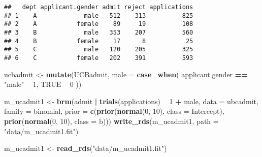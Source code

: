 \documentclass[]{article}
\newenvironment{Shaded}{\begin{snugshade}}{\end{snugshade}}
\newcommand{\KeywordTok}[1]{\textcolor[rgb]{0.13,0.29,0.53}{\textbf{#1}}}
\newcommand{\DataTypeTok}[1]{\textcolor[rgb]{0.13,0.29,0.53}{#1}}
\newcommand{\DecValTok}[1]{\textcolor[rgb]{0.00,0.00,0.81}{#1}}
\newcommand{\StringTok}[1]{\textcolor[rgb]{0.31,0.60,0.02}{#1}}
\newcommand{\OtherTok}[1]{\textcolor[rgb]{0.56,0.35,0.01}{#1}}
\newcommand{\OperatorTok}[1]{\textcolor[rgb]{0.81,0.36,0.00}{\textbf{#1}}}
\newcommand{\NormalTok}[1]{#1}
\begin{document}
\begin{verbatim}
##   dept applicant.gender admit reject applications
## 1    A             male   512    313          825
## 2    A           female    89     19          108
## 3    B             male   353    207          560
## 4    B           female    17      8           25
## 5    C             male   120    205          325
## 6    C           female   202    391          593
\end{verbatim}

\begin{Shaded}
\begin{Highlighting}[]
\NormalTok{ucbadmit <-}\StringTok{ }\KeywordTok{mutate}\NormalTok{(UCBadmit, }\DataTypeTok{male =} \KeywordTok{case_when}\NormalTok{(}
\NormalTok{  applicant.gender }\OperatorTok{==}\StringTok{ "male"} \OperatorTok{~}\StringTok{ }\DecValTok{1}\NormalTok{,}
  \OtherTok{TRUE} \OperatorTok{~}\StringTok{ }\DecValTok{0}
\NormalTok{))}
\end{Highlighting}
\end{Shaded}

\begin{Shaded}
\begin{Highlighting}[]
\NormalTok{m_ucadmit1 <-}\StringTok{ }\KeywordTok{brm}\NormalTok{(admit }\OperatorTok{|}\StringTok{ }\KeywordTok{trials}\NormalTok{(applications) }\OperatorTok{~}\StringTok{ }\DecValTok{1} \OperatorTok{+}\StringTok{ }\NormalTok{male,}
                  \DataTypeTok{data =}\NormalTok{ ubcadmit, }
                  \DataTypeTok{family =}\NormalTok{ binomial,}
                  \DataTypeTok{prior =} \KeywordTok{c}\NormalTok{(}\KeywordTok{prior}\NormalTok{(}\KeywordTok{normal}\NormalTok{(}\DecValTok{0}\NormalTok{, }\DecValTok{10}\NormalTok{), }\DataTypeTok{class =}\NormalTok{ Intercept), }
                            \KeywordTok{prior}\NormalTok{(}\KeywordTok{normal}\NormalTok{(}\DecValTok{0}\NormalTok{, }\DecValTok{10}\NormalTok{), }\DataTypeTok{class =}\NormalTok{ b)))}
\KeywordTok{write_rds}\NormalTok{(m_ucadmit1, }\DataTypeTok{path =} \StringTok{"data/m_ucadmit1.fit"}\NormalTok{)}
\end{Highlighting}
\end{Shaded}

\begin{Shaded}
\begin{Highlighting}[]
\NormalTok{m_ucadmit1 <-}\StringTok{ }\KeywordTok{read_rds}\NormalTok{(}\StringTok{"data/m_ucadmit1.fit"}\NormalTok{)}
\end{Highlighting}
\end{Shaded}
\end{document}
